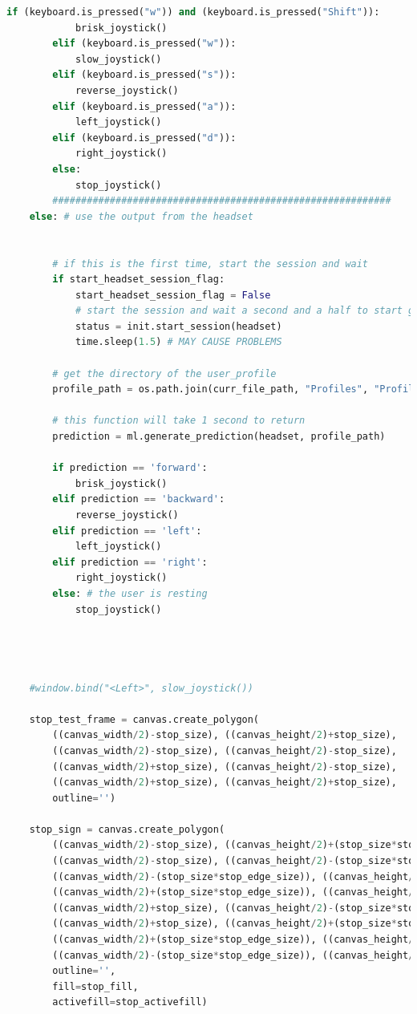 \documentclass[conference]{IEEEtran}
\begin{document}
\begin{lstlisting}[language=Python, caption=GUI CODE, label=gui_code]
        if (keyboard.is_pressed("w")) and (keyboard.is_pressed("Shift")):
            brisk_joystick()
        elif (keyboard.is_pressed("w")):
            slow_joystick()
        elif (keyboard.is_pressed("s")):
            reverse_joystick()
        elif (keyboard.is_pressed("a")):
            left_joystick()
        elif (keyboard.is_pressed("d")):
            right_joystick()
        else:
            stop_joystick()
        ###########################################################
    else: # use the output from the headset
       
        
        # if this is the first time, start the session and wait 
        if start_headset_session_flag:
            start_headset_session_flag = False
            # start the session and wait a second and a half to start gathering data
            status = init.start_session(headset)
            time.sleep(1.5) # MAY CAUSE PROBLEMS

        # get the directory of the user_profile
        profile_path = os.path.join(curr_file_path, "Profiles", "Profile" + profSelected)
          
        # this function will take 1 second to return
        prediction = ml.generate_prediction(headset, profile_path)

        if prediction == 'forward':
            brisk_joystick()
        elif prediction == 'backward':
            reverse_joystick()
        elif prediction == 'left':
            left_joystick()
        elif prediction == 'right':
            right_joystick()
        else: # the user is resting
            stop_joystick()


        

    #window.bind("<Left>", slow_joystick())

    stop_test_frame = canvas.create_polygon(
        ((canvas_width/2)-stop_size), ((canvas_height/2)+stop_size),
        ((canvas_width/2)-stop_size), ((canvas_height/2)-stop_size),
        ((canvas_width/2)+stop_size), ((canvas_height/2)-stop_size),
        ((canvas_width/2)+stop_size), ((canvas_height/2)+stop_size),
        outline='')

    stop_sign = canvas.create_polygon(
        ((canvas_width/2)-stop_size), ((canvas_height/2)+(stop_size*stop_edge_size)),       # first point
        ((canvas_width/2)-stop_size), ((canvas_height/2)-(stop_size*stop_edge_size)),       # second point
        ((canvas_width/2)-(stop_size*stop_edge_size)), ((canvas_height/2)-stop_size),       # third point
        ((canvas_width/2)+(stop_size*stop_edge_size)), ((canvas_height/2)-stop_size),       # fourth point
        ((canvas_width/2)+stop_size), ((canvas_height/2)-(stop_size*stop_edge_size)),       # fifth point
        ((canvas_width/2)+stop_size), ((canvas_height/2)+(stop_size*stop_edge_size)),       # sixth point
        ((canvas_width/2)+(stop_size*stop_edge_size)), ((canvas_height/2)+stop_size),       # seventh point
        ((canvas_width/2)-(stop_size*stop_edge_size)), ((canvas_height/2)+stop_size),       # eighth point
        outline='',
        fill=stop_fill,
        activefill=stop_activefill)


\end{lstlisting}
\end{document}
